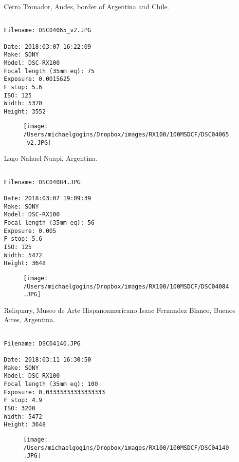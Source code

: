 \documentclass[11pt,letter,DIV=14,paper=landscape]{scrbook}
\begin{document}
\clearpage
\noindent Cerro Tronador, Andes, border of Argentina and Chile.
\noindent
\begin{lstlisting}

Filename: DSC04065_v2.JPG

Date: 2018:03:07 16:22:09
Make: SONY
Model: DSC-RX100
Focal length (35mm eq): 75
Exposure: 0.0015625
F stop: 5.6
ISO: 125
Width: 5370
Height: 3552
\end{lstlisting}
\clearpage

\begin{figure}
\texttt{[image: /Users/michaelgogins/Dropbox/images/RX100/100MSDCF/DSC04065\_v2.JPG]}
\end{figure}
    
\clearpage
\noindent Lago Nahuel Nuapi, Argentina.
\noindent
\begin{lstlisting}

Filename: DSC04084.JPG

Date: 2018:03:07 19:09:39
Make: SONY
Model: DSC-RX100
Focal length (35mm eq): 56
Exposure: 0.005
F stop: 5.6
ISO: 125
Width: 5472
Height: 3648
\end{lstlisting}
\clearpage

\begin{figure}
\texttt{[image: /Users/michaelgogins/Dropbox/images/RX100/100MSDCF/DSC04084.JPG]}
\end{figure}
    
\clearpage
\noindent Reliquary, Museo de Arte Hispanoamericano Isaac Fernandez Blanco, Buenos Aires, Argentina.
\noindent
\begin{lstlisting}

Filename: DSC04140.JPG

Date: 2018:03:11 16:30:50
Make: SONY
Model: DSC-RX100
Focal length (35mm eq): 100
Exposure: 0.03333333333333333
F stop: 4.9
ISO: 3200
Width: 5472
Height: 3648
\end{lstlisting}
\clearpage

\begin{figure}
\texttt{[image: /Users/michaelgogins/Dropbox/images/RX100/100MSDCF/DSC04140.JPG]}
\end{figure}
    
\end{document}
